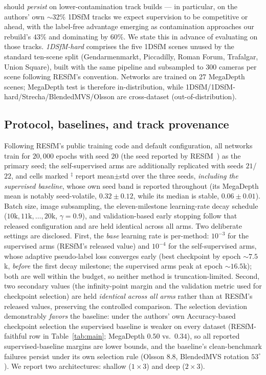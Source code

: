 \documentclass{article}
\renewcommand{\deg}{^{\circ}}
\begin{document}
should \emph{persist} on lower-contamination track builds --- in particular, on the
authors' own ${\sim}32\%$ 1DSfM tracks we expect supervision to be competitive or ahead,
with the label-free advantage emerging as contamination approaches our rebuild's $43\%$
and dominating by $60\%$. We state this in advance of evaluating on those tracks. \emph{1DSfM-hard} comprises the five 1DSfM scenes unused by the standard
ten-scene split (Gendarmenmarkt, Piccadilly, Roman Forum, Trafalgar, Union Square), built
with the same pipeline and subsampled to $300$ cameras per scene following RESfM's
convention. Networks are trained on 27 MegaDepth scenes; MegaDepth test is therefore
in-distribution, while 1DSfM/1DSfM-hard/Strecha/BlendedMVS/Olsson are cross-dataset
(out-of-distribution).

\subsection{Protocol, baselines, and track provenance}\label{sec:protocol}
Following RESfM's public training code and default configuration, all networks train for
$20{,}000$ epochs with seed $20$ (the seed reported by RESfM~\citep{resfm}) as the primary
seed; the self-supervised arms are additionally replicated with seeds $21$/$22$, and cells
marked $^{\ddagger}$ report mean$\pm$std over the three seeds, \emph{including the
supervised baseline}, whose own seed band is reported throughout (its MegaDepth mean is
notably seed-volatile, $0.32\pm0.12$, while its median is stable, $0.06\pm0.01$). Batch size,
image subsampling, the eleven-milestone learning-rate decay schedule
($10\mathrm{k},11\mathrm{k},\dots,20\mathrm{k}$, $\gamma{=}0.9$), and validation-based
early stopping follow that released configuration and are held identical across all arms.
Two deliberate settings are disclosed. First, the \emph{base} learning rate is per-method:
$10^{-3}$ for the supervised arms (RESfM's released value) and $10^{-4}$ for the
self-supervised arms, whose adaptive pseudo-label loss converges early (best checkpoint by
epoch ${\sim}7.5$k, \emph{before} the first decay milestone; the supervised arms peak at
epoch ${\sim}16.5$k); both are well within the budget, so neither method is
truncation-limited. Second, two secondary values (the infinity-point margin and the
validation metric used for checkpoint selection) are held \emph{identical across all arms}
rather than at RESfM's released values, preserving the controlled comparison. The
selection deviation demonstrably \emph{favors} the baseline: under the authors' own
Accuracy-based checkpoint selection the supervised baseline is weaker on every dataset
(RESfM-faithful row in Table~\ref{tab:main}; MegaDepth $0.50$ vs.\ $0.34$), so all
reported supervised-baseline margins are lower bounds, and the baseline's clean-benchmark
failures persist under its own selection rule (Olsson $8.8$, BlendedMVS rotation
$53\deg$). We report two
architectures: shallow ($1{\times}3$) and deep ($2{\times}3$).
\end{document}
